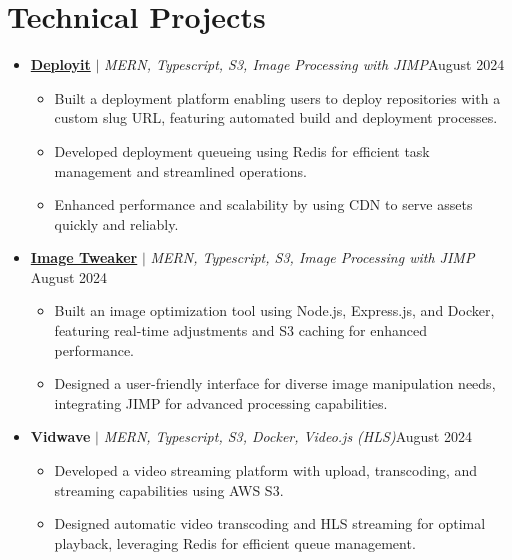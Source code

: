 \documentclass[letterpaper,11pt]{article}
\begin{document}
\section{Technical Projects}
\vspace{-1pt}
\begin{itemize}[leftmargin=*,itemsep=2pt,parsep=0pt,topsep=0pt,partopsep=0pt]

    \item \textbf{\href{https://deployit.live/}{Deployit}} $|$ \emph{MERN, Typescript, S3, Image Processing with JIMP}\hfill {August 2024}
          \begin{itemize}[leftmargin=*,itemsep=1pt,parsep=0pt,topsep=0pt,partopsep=0pt]
              \item Built a deployment platform enabling users to deploy repositories with a custom
                    slug URL, featuring automated build and deployment processes.
              \item Developed deployment queueing using Redis for efficient task management and
                    streamlined operations.
              \item Enhanced performance and scalability by using CDN to serve assets quickly and
                    reliably.
          \end{itemize}

    \item \textbf{\href{https://image-tweaker.devpulkit.in/}{Image Tweaker}} $|$ \emph{MERN, Typescript, S3, Image Processing with JIMP} \hfill { August 2024}
          \begin{itemize}[leftmargin=*,itemsep=1pt,parsep=0pt,topsep=0pt,partopsep=0pt]
              \item Built an image optimization tool using Node.js, Express.js, and Docker,
                    featuring real-time adjustments and S3 caching for enhanced performance.
              \item Designed a user-friendly interface for diverse image manipulation needs,
                    integrating JIMP for advanced processing capabilities.
          \end{itemize}

    \item \textbf{Vidwave} $|$ \emph{MERN, Typescript, S3, Docker, Video.js (HLS)}\hfill {August 2024}
          \begin{itemize}[leftmargin=*,itemsep=1pt,parsep=0pt,topsep=0pt,partopsep=0pt]
              \item Developed a video streaming platform with upload, transcoding, and streaming
                    capabilities using AWS S3.
              \item Designed automatic video transcoding and HLS streaming for optimal playback,
                    leveraging Redis for efficient queue management.
          \end{itemize}

\end{itemize}
\vspace{-8pt}
\end{document}
